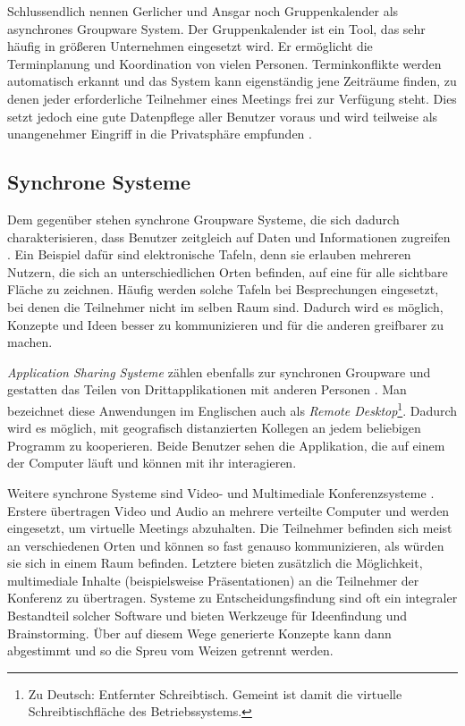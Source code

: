 Schlussendlich nennen Gerlicher und Ansgar noch Gruppenkalender als asynchrones Groupware System. Der Gruppenkalender ist ein Tool, das sehr häufig in größeren Unternehmen eingesetzt wird. Er ermöglicht die Terminplanung und Koordination von vielen Personen. Terminkonflikte werden automatisch erkannt und das System kann eigenständig jene Zeiträume finden, zu denen jeder erforderliche Teilnehmer eines Meetings frei zur Verfügung steht. Dies setzt jedoch eine gute Datenpflege aller Benutzer voraus und wird teilweise als unangenehmer Eingriff in die Privatsphäre empfunden \citep{Gerlicher:2007p241}.

\subsection{Synchrone Systeme}

Dem gegenüber stehen synchrone Groupware Systeme, die sich dadurch charakterisieren, dass Benutzer zeitgleich auf Daten und Informationen zugreifen \citep{Gerlicher:2007p241}. Ein Beispiel dafür sind elektronische Tafeln, denn sie erlauben mehreren Nutzern, die sich an unterschiedlichen Orten befinden, auf eine für alle sichtbare Fläche zu zeichnen. Häufig werden solche Tafeln bei Besprechungen eingesetzt, bei denen die Teilnehmer nicht im selben Raum sind. Dadurch wird es möglich, Konzepte und Ideen besser zu kommunizieren und für die anderen greifbarer zu machen.

\emph{Application Sharing Systeme} zählen ebenfalls zur synchronen Groupware und gestatten das Teilen von Drittapplikationen mit anderen Personen \citep{Gerlicher:2007p241}. Man bezeichnet diese Anwendungen im Englischen auch als \emph{Remote Desktop}\footnote{Zu Deutsch: Entfernter Schreibtisch. Gemeint ist damit die virtuelle Schreibtischfläche des Betriebssystems.}. Dadurch wird es möglich, mit geografisch distanzierten Kollegen an jedem beliebigen Programm zu kooperieren. Beide Benutzer sehen die Applikation, die auf einem der Computer läuft und können mit ihr interagieren. 

Weitere synchrone Systeme sind Video- und Multimediale Konferenzsysteme \citep{Gerlicher:2007p241}. Erstere übertragen Video und Audio an mehrere verteilte Computer und werden eingesetzt, um virtuelle Meetings abzuhalten. Die Teilnehmer befinden sich meist an verschiedenen Orten und können so fast genauso kommunizieren, als würden sie sich in einem Raum befinden. Letztere bieten zusätzlich die Möglichkeit, multimediale Inhalte (beispielsweise Präsentationen) an die Teilnehmer der Konferenz zu übertragen. Systeme zu Entscheidungsfindung sind oft ein integraler Bestandteil solcher Software und bieten Werkzeuge für Ideenfindung und Brainstorming. Über auf diesem Wege generierte Konzepte kann dann abgestimmt und so die Spreu vom Weizen getrennt werden. 

